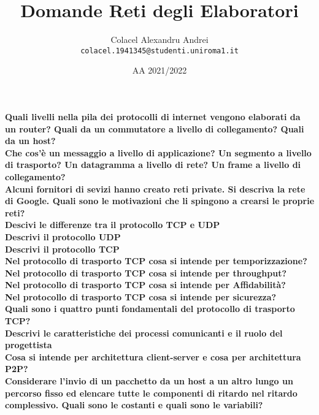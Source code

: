 \documentclass[11pt, oneside]{article}   	%
\title{Domande Reti degli Elaboratori}
\author{Colacel Alexandru Andrei\\ \texttt{colacel.1941345@studenti.uniroma1.it}}
\date{AA 2021/2022}							%
\begin{document}
\maketitle

\textbf{Quali livelli nella pila dei protocolli di internet vengono elaborati da un router? Quali da un commutatore a livello di collegamento? Quali da un host?}\\


\textbf{Che cos'è un messaggio a livello di applicazione? Un segmento a livello di trasporto? Un datagramma a livello di rete? Un frame a livello di collegamento?}\\ 	
	
\textbf{Alcuni fornitori di sevizi hanno creato reti private. Si descriva la rete di Google. Quali sono le motivazioni che li spingono a crearsi le proprie reti?}\\

\textbf{Descivi le differenze tra il protocollo TCP e UDP}\\

\textbf{Descrivi il protocollo UDP}\\

\textbf{Descrivi il protocollo TCP}\\

\textbf{Nel protocollo di trasporto TCP cosa si intende per temporizzazione?}\\

\textbf{Nel protocollo di trasporto TCP cosa si intende per throughput?}\\

\textbf{Nel protocollo di trasporto TCP cosa si intende per Affidabilità?}\\

\textbf{Nel protocollo di trasporto TCP cosa si intende per sicurezza?}\\

\textbf{Quali sono i quattro punti fondamentali del protocollo di trasporto TCP?}\\

\textbf{Descrivi le caratteristiche dei processi comunicanti e il ruolo del progettista}\\

\textbf{Cosa si intende per architettura client-server e cosa per architettura P2P?}\\

\textbf{Considerare l’invio di un pacchetto da un host a un altro lungo un percorso fisso ed elencare tutte le componenti di ritardo nel ritardo complessivo. Quali sono le costanti e quali sono le variabili?}\\
\end{document}
